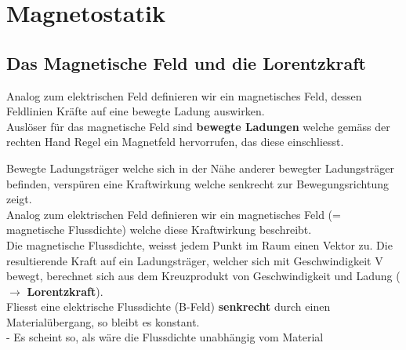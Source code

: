 \newpage
\section{Magnetostatik}
\subsection{Das Magnetische Feld und die Lorentzkraft}

Analog zum elektrischen Feld definieren wir ein magnetisches Feld, dessen Feldlinien Kräfte auf eine bewegte Ladung auswirken. \\
Auslöser für das magnetische Feld sind \textbf{bewegte Ladungen} welche gemäss der rechten Hand Regel ein Magnetfeld hervorrufen, das diese einschliesst. \\
\begin{center}


\end{center}
\beginip
Bewegte Ladungsträger welche sich in der Nähe anderer bewegter Ladungsträger befinden, verspüren eine Kraftwirkung welche senkrecht zur Bewegungsrichtung zeigt. \\
Analog zum elektrischen Feld definieren wir ein magnetisches Feld (= magnetische Flussdichte) welche diese Kraftwirkung beschreibt. \\
Die magnetische Flussdichte, weisst jedem Punkt im Raum einen Vektor zu. Die resultierende Kraft auf ein Ladungsträger, welcher sich mit Geschwindigkeit V bewegt,
berechnet sich aus dem Kreuzprodukt von Geschwindigkeit und Ladung ($\rightarrow$ \textbf{Lorentzkraft}). \\
Fliesst eine elektrische Flussdichte (B-Feld) \textbf{senkrecht} durch einen Materialübergang, so bleibt es konstant. \\
- Es scheint so, als wäre die Flussdichte unabhängig vom Material
\iend




